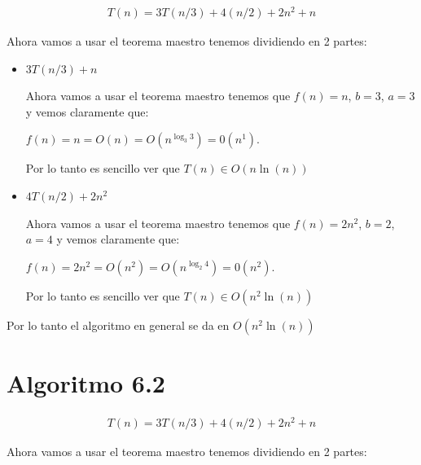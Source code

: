 \documentclass[12pt, fleqn]{article}                            %
\theoremstyle{break}                                            %
\begin{document}
        \begin{align*}
            T(n) = 3T(n / 3) + 4(n / 2) + 2n^2 + n
        \end{align*}

        Ahora vamos a usar el teorema maestro tenemos dividiendo en 2 partes:

        \begin{itemize}
            
            \item 
                $3T(n / 3) + n$
                
                Ahora vamos a usar el teorema maestro tenemos que $f(n) = n$, $b = 3$, $a = 3$
                y vemos claramente que: 

                $f(n) = n = O(n) = O(n^{\log_3 3}) = 0(n^1)$.

                Por lo tanto es sencillo ver que $T(n) \in O(n \ln(n))$ 

            \item 
                $4T(n / 2) + 2n^2$
                
                Ahora vamos a usar el teorema maestro tenemos que $f(n) = 2n^2$, $b = 2$, $a = 4$
                y vemos claramente que: 

                $f(n) = 2n^2 = O(n^2) = O(n^{\log_2 4}) = 0(n^2)$.

                Por lo tanto es sencillo ver que $T(n) \in O(n^2 \ln(n))$ 

        \end{itemize}

        Por lo tanto el algoritmo en general se da en $O(n^2 \ln(n))$



    \clearpage
    \section{Algoritmo 6.2}

        \begin{align*}
            T(n) = 3T(n / 3) + 4(n / 2) + 2n^2 + n
        \end{align*}

        Ahora vamos a usar el teorema maestro tenemos dividiendo en 2 partes:
\end{document}
